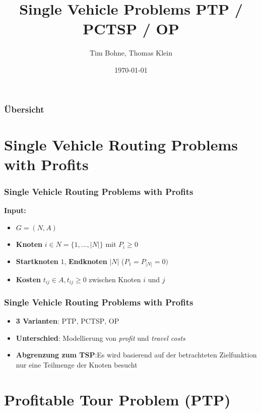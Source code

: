 \documentclass{beamer}
\title[]{Single Vehicle Problems \textsc{PTP} / \textsc{PCTSP} / \textsc{OP}}
\author{Tim Bohne, Thomas Klein}
\institute[]
{
\textit{Master-Projektgruppe - Team Orienteering Problems für individuelle Touristenrouten}
\medskip
}
\date{\today}
\begin{document}
\begin{frame}[plain] %
\titlepage %
\end{frame}

\begin{frame}
\frametitle{Übersicht} %
\tableofcontents
\end{frame}

\section{Single Vehicle Routing Problems with Profits}

\begin{frame}
  \frametitle{Single Vehicle Routing Problems with Profits}
  \textbf{Input:}
  \begin{itemize}
    \item $G = (N, A)$
    \item \textbf{Knoten} $i \in N = \{1, ..., |N|\}$ mit $P_i \geq 0$
    \item \textbf{Startknoten} $1$, \textbf{Endknoten} $|N|$ ($P_1 = P_{|N|} = 0)$
    \item \textbf{Kosten} $t_{ij} \in A, t_{ij} \geq 0$ zwischen Knoten $i$ und $j$
  \end{itemize}
\end{frame}

\begin{frame}
\frametitle{Single Vehicle Routing Problems with Profits}
\begin{itemize}
  \item \textbf{3 Varianten}: \textsc{PTP}, \textsc{PCTSP}, \textsc{OP}
  \item \textbf{Unterschied}: Modellierung von \textit{profit} und \textit{travel costs}
  \item \textbf{Abgrenzung zum \textsc{TSP}}:\newline Es wird basierend auf der betrachteten
  Zielfunktion nur eine Teilmenge der Knoten besucht
\end{itemize}
\end{frame}

\section{Profitable Tour Problem (\textsc{PTP})}
\end{document}
